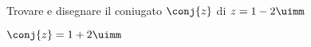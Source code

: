 Trovare e disegnare il coniugato $\conj{z}$ di $z=1-2\uimm$

$\conj{z}=1+2\uimm$
\begin{center}

\label{fig:disegnopianocomplesso05}
\end{center}
 
